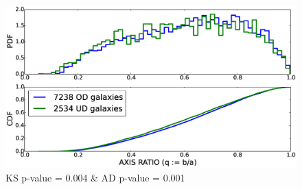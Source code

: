 \documentclass[twocolumn,useAMS,usenatbib]{mn2e}
\begin{document}


\begin{figure}
 \centering
 \includegraphics[width=\columnwidth]{axis_ratio_all.eps}
 \caption{KS p-value = 0.004 \& AD p-value = 0.001}
 \label{fig:axisratio_all}
\end{figure}
\end{document}
